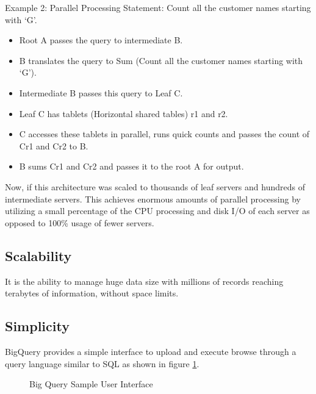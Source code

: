 \documentclass[9pt,twocolumn,twoside]{../../styles/osajnl}
\begin{document}
\noindent
Example 2: Parallel Processing \newline
Statement: Count all the customer names
starting with ‘G’. \newline

\begin{itemize}[noitemsep,topsep=0pt]
\item Root A passes the query to intermediate B. \item B translates
  the query to Sum (Count all the customer names starting with
  ‘G’). \item Intermediate B passes this query to Leaf C. \item Leaf C
  has tablets (Horizontal shared tables) r1 and r2. \item C accesses
  these tablets in parallel, runs quick counts and passes the count of
  Cr1 and Cr2 to B. \item B sums Cr1 and Cr2 and passes it to the root
  A for output. \end{itemize}

\noindent
Now, if this architecture was scaled to thousands of leaf servers and
hundreds of intermediate servers. This achieves enormous amounts of
parallel processing by utilizing a small percentage of the CPU
processing and disk I/O of each server as opposed to 100\% usage of
fewer servers.

\subsection{Scalability}
It is the ability to manage huge data size with millions of records
reaching terabytes of information, without space limits\cite{www-bigquery}.

\subsection{Simplicity}
BigQuery provides a simple interface to upload and execute browse
through a query language similar to SQL as shown in figure \ref{fig:bigqueryinterface}.

\begin{figure}[htbp]
\centering
{}
\caption{\cite{www-userinterface-bigquery} Big Query Sample User Interface}
\label{fig:bigqueryinterface}
\end{figure}
\end{document}
